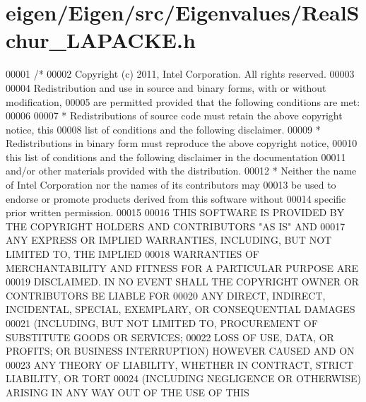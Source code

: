 \hypertarget{eigen_2_eigen_2src_2_eigenvalues_2_real_schur___l_a_p_a_c_k_e_8h_source}{}\section{eigen/\+Eigen/src/\+Eigenvalues/\+Real\+Schur\+\_\+\+L\+A\+P\+A\+C\+KE.h}
\label{eigen_2_eigen_2src_2_eigenvalues_2_real_schur___l_a_p_a_c_k_e_8h_source}

\begin{DoxyCode}
00001 \textcolor{comment}{/*}
00002 \textcolor{comment}{ Copyright (c) 2011, Intel Corporation. All rights reserved.}
00003 \textcolor{comment}{}
00004 \textcolor{comment}{ Redistribution and use in source and binary forms, with or without modification,}
00005 \textcolor{comment}{ are permitted provided that the following conditions are met:}
00006 \textcolor{comment}{}
00007 \textcolor{comment}{ * Redistributions of source code must retain the above copyright notice, this}
00008 \textcolor{comment}{   list of conditions and the following disclaimer.}
00009 \textcolor{comment}{ * Redistributions in binary form must reproduce the above copyright notice,}
00010 \textcolor{comment}{   this list of conditions and the following disclaimer in the documentation}
00011 \textcolor{comment}{   and/or other materials provided with the distribution.}
00012 \textcolor{comment}{ * Neither the name of Intel Corporation nor the names of its contributors may}
00013 \textcolor{comment}{   be used to endorse or promote products derived from this software without}
00014 \textcolor{comment}{   specific prior written permission.}
00015 \textcolor{comment}{}
00016 \textcolor{comment}{ THIS SOFTWARE IS PROVIDED BY THE COPYRIGHT HOLDERS AND CONTRIBUTORS "AS IS" AND}
00017 \textcolor{comment}{ ANY EXPRESS OR IMPLIED WARRANTIES, INCLUDING, BUT NOT LIMITED TO, THE IMPLIED}
00018 \textcolor{comment}{ WARRANTIES OF MERCHANTABILITY AND FITNESS FOR A PARTICULAR PURPOSE ARE}
00019 \textcolor{comment}{ DISCLAIMED. IN NO EVENT SHALL THE COPYRIGHT OWNER OR CONTRIBUTORS BE LIABLE FOR}
00020 \textcolor{comment}{ ANY DIRECT, INDIRECT, INCIDENTAL, SPECIAL, EXEMPLARY, OR CONSEQUENTIAL DAMAGES}
00021 \textcolor{comment}{ (INCLUDING, BUT NOT LIMITED TO, PROCUREMENT OF SUBSTITUTE GOODS OR SERVICES;}
00022 \textcolor{comment}{ LOSS OF USE, DATA, OR PROFITS; OR BUSINESS INTERRUPTION) HOWEVER CAUSED AND ON}
00023 \textcolor{comment}{ ANY THEORY OF LIABILITY, WHETHER IN CONTRACT, STRICT LIABILITY, OR TORT}
00024 \textcolor{comment}{ (INCLUDING NEGLIGENCE OR OTHERWISE) ARISING IN ANY WAY OUT OF THE USE OF THIS}

\end{DoxyCode}
